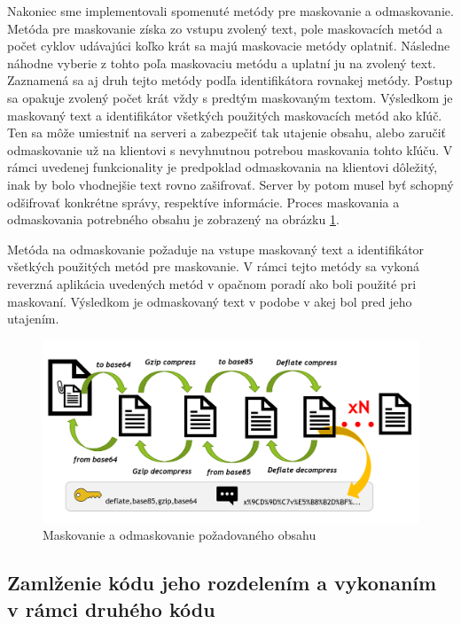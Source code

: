 \documentclass[conference, 11pt,slovak,a4paper,twoside]{IEEEtran}
\begin{document}
Nakoniec sme implementovali spomenuté metódy pre maskovanie a odmaskovanie. Metóda pre maskovanie získa zo vstupu zvolený text, pole maskovacích metód a počet cyklov udávajúci koľko krát sa majú maskovacie metódy oplatniť. Následne náhodne vyberie z tohto poľa maskovaciu metódu a uplatní ju na zvolený text. Zaznamená sa aj druh tejto metódy podľa identifikátora rovnakej metódy. Postup sa opakuje zvolený počet krát vždy s predtým maskovaným textom. Výsledkom je maskovaný text a identifikátor všetkých použitých maskovacích metód ako kľúč. Ten sa môže umiestniť na serveri a zabezpečiť tak utajenie obsahu, alebo zaručiť odmaskovanie už na klientovi s nevyhnutnou potrebou maskovania tohto kľúču. V rámci uvedenej funkcionality je predpoklad odmaskovania na klientovi dôležitý, inak by bolo vhodnejšie text rovno zašifrovať. Server by potom musel byť schopný odšifrovať konkrétne správy, respektíve informácie. Proces maskovania a odmaskovania potrebného obsahu je zobrazený na obrázku \ref{contentConcealing}.

Metóda na odmaskovanie požaduje na vstupe maskovaný text a identifikátor všetkých použitých metód pre maskovanie. V rámci tejto metódy sa vykoná reverzná aplikácia uvedených metód v opačnom poradí ako boli použité pri maskovaní. Výsledkom je odmaskovaný text v podobe v akej bol pred jeho utajením.


\begin{figure}[!t]  %
					\begin{center}
									\includegraphics[width=\linewidth]{fig/masking.png}
									\caption{Maskovanie a odmaskovanie požadovaného obsahu}
									\label{contentConcealing}
					\end{center}
\end{figure}



\subsection{Zamlženie kódu jeho rozdelením a vykonaním v rámci druhého kódu} \label{codeObfuscation}
\end{document}
